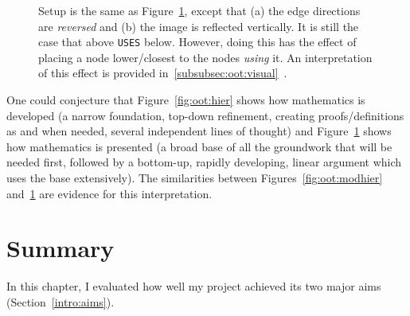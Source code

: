 \begin{figure}[p]
\begin{minipage}{0.5\textwidth-0.5em}
      \caption{Setup is the same as Figure~\ref{fig:oot:hierflip}, except that
      (a) the edge directions are \emph{reversed} and (b) the image is
      reflected vertically. It is still the case that above \texttt{USES} below.
      However, doing this has the effect of placing a node lower/closest to
      the nodes \emph{using} it. An interpretation of this effect is provided
      in~\ref{subsubsec:oot:visual}~.}\label{fig:oot:hierflip}
  \end{minipage}
\end{figure}

One could conjecture that Figure~\ref{fig:oot:hier} shows how mathematics is
developed (a narrow foundation, top-down refinement, creating proofs/definitions
as and when needed, several independent lines of thought) and
Figure~\ref{fig:oot:hierflip} shows how mathematics is presented (a broad base
of all the groundwork that will be needed first, followed by a bottom-up,
rapidly developing, linear argument which uses the base extensively). The
similarities between Figures~\ref{fig:oot:modhier} and~\ref{fig:oot:hierflip}
are evidence for this interpretation.

\newpage%
\section{Summary}

In this chapter, I evaluated how well my project achieved its two major aims
(Section~\ref{intro:aims}).

